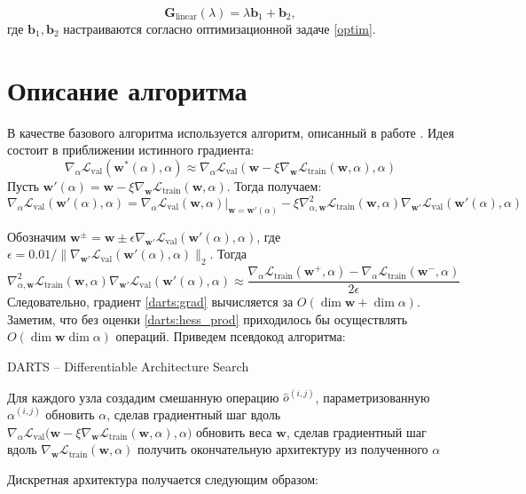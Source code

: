 \documentclass[12pt, twoside]{article}
\begin{document}
 \begin{equation}\label{hypernet}
 \mathbf{G}_{\text{linear}}(\lambda) = \lambda \mathbf{b}_1 + \mathbf{b}_2,
 \end{equation}
 где $\mathbf{b}_1, \mathbf{b}_2$ настраиваются согласно оптимизационной задаче \ref{optim}.

\section{Описание алгоритма}
 В качестве базового алгоритма используется алгоритм, описанный в работе \cite{journals/corr/abs-1806-09055}. Идея состоит в приближении истинного градиента:
$$\nabla_\alpha\mathcal{L}_\text{val}(\mathbf{w}^*(\alpha), \alpha) \approx \nabla_\alpha\mathcal{L}_\text{val}(\mathbf{w} - \xi\nabla_\mathbf{w}\mathcal{L}_\text{train}(\mathbf{w}, \alpha), \alpha)$$
Пусть $\mathbf{w}'(\alpha) = \mathbf{w} - \xi\nabla_\mathbf{w}\mathcal{L}_\text{train}(\mathbf{w}, \alpha)$. Тогда получаем:
\begin{equation}
\label{darts:grad}
\nabla_\alpha\mathcal{L}_\text{val}(\mathbf{w}'(\alpha), \alpha) = \nabla_\alpha\mathcal{L}_\text{val}(\mathbf{w}, \alpha)\big|_{\mathbf{w} = \mathbf{w}'(\alpha)} - \xi\nabla^2_{\alpha, \mathbf{w}}\mathcal{L}_\text{train}(\mathbf{w}, \alpha)\nabla_\mathbf{w'}\mathcal{L}_\text{val}(\mathbf{w}'(\alpha), \alpha)
\end{equation}

Обозначим $\mathbf{w}^{\pm} = \mathbf{w}\pm\epsilon\nabla_\mathbf{w'}\mathcal{L}_\text{val}(\mathbf{w}'(\alpha), \alpha)$, где $\epsilon = 0.01/\|\nabla_\mathbf{w'}\mathcal{L}_\text{val}(\mathbf{w}'(\alpha), \alpha) \|_2$.
Тогда
\begin{equation}
\label{darts:hess_prod}
\nabla^2_{\alpha, \mathbf{w}}\mathcal{L}_\text{train}(\mathbf{w}, \alpha)\nabla_\mathbf{w'}\mathcal{L}_\text{val}(\mathbf{w}'(\alpha), \alpha) \approx \frac{\nabla_\alpha\mathcal{L}_\text{train}(\mathbf{w}^+, \alpha) - \nabla_\alpha\mathcal{L}_\text{train}(\mathbf{w}^-, \alpha)}{2\epsilon}
\end{equation}
Следовательно, градиент \ref{darts:grad} вычисляется за $O(\dim\mathbf{w} + \dim\alpha)$. Заметим, что без оценки \ref{darts:hess_prod} приходилось бы осуществлять $O(\dim\mathbf{w}\dim\alpha)$ операций. Приведем псевдокод алгоритма:

 \begin{algorithm}[H]
\begin{algorithmic}[1]
\caption{DARTS -- Differentiable Architecture Search}
\label{alg:darts}
\STATE Для каждого узла создадим смешанную операцию $\hat{o}^{(i, j)}$, параметризованную $\alpha^{(i, j)}$
\STATE  обновить $\alpha$, сделав градиентный шаг вдоль $\nabla_\alpha \mathcal{L}_\text{val}\bigl(\mathbf{w} - \xi\nabla_{\mathbf{w}}\mathcal{L}_\text{train}(\mathbf{w}, \alpha), \alpha\bigr)$
\STATE обновить веса $\mathbf{w}$, сделав градиентный шаг вдоль $\nabla_\mathbf{w}\mathcal{L}_\text{train}(\mathbf{w}, \alpha)$
\ENDWHILE
\STATE получить окончательную архитектуру из полученного $\alpha$
\end{algorithmic}
\end{algorithm}
Дискретная архитектура получается следующим образом:
\end{document}
